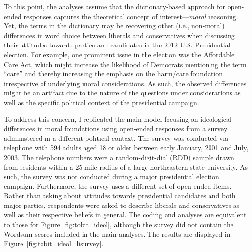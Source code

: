 \documentclass[12pt]{article}
\begin{document}
To this point, the analyses assume that the dictionary-based approach for open-ended responses captures the theoretical concept of interest---\textit{moral} reasoning. Yet, the terms in the dictionary may be recovering other (i.e., non-moral) differences in word choice between liberals and conservatives when discussing their attitudes towards parties and candidates in the 2012 U.S. Presidential election. For example, one prominent issue in the election was the Affordable Care Act, which might increase the likelihood of Democrats mentioning the term ``care'' and thereby increasing the emphasis on the harm/care foundation irrespective of underlying moral considerations. As such, the observed differences might be an artifact due to the nature of the questions under considerations as well as the specific political context of the presidential campaign.

To address this concern, I replicated the main model focusing on ideological differences in moral foundations using open-ended responses from a survey administered in a different political context. The survey was conducted via telephone with 594 adults aged 18 or older between early January, 2001 and July, 2003. The telephone numbers were a random-digit-dial (RDD) sample drawn from residents within a 25 mile radius of a large northeastern state university. As such, the survey was not conducted during a  major presidential election campaign. Furthermore, the survey uses a different set of open-ended items. Rather than asking about attitudes towards presidential candidates and both major parties, respondents were asked to describe liberals and conservatives as well as their respective beliefs in general. The coding and analyses are equivalent to those for Figure~\ref{fig:tobit_ideol}, although the survey did not contain the Wordsum scores included in the main analyses. The results are displayed in Figure~\ref{fig:tobit_ideol_lisurvey}.
\end{document}
